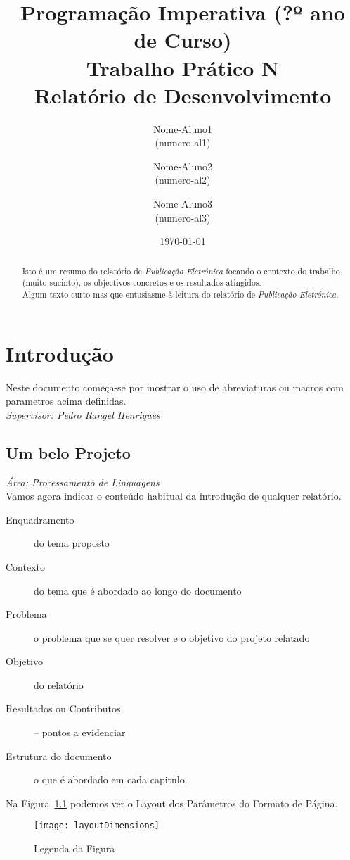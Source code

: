 \documentclass[12pt,a4paper]{report}%
\title{Programação Imperativa (?º ano de Curso)\\
       \textbf{Trabalho Prático N}\\ Relatório de Desenvolvimento
       } %
\author{Nome-Aluno1\\ (numero-al1) \and Nome-Aluno2\\ (numero-al2)
         \and Nome-Aluno3\\ (numero-al3)
       } %
\date{\today} %
\def\pe{\emph{Publicação Eletrónica}\xspace}
\def\titulo#1{\section{#1}}    %
\def\super#1{{\em Supervisor: #1}\\ }
\def\area#1{{\em \'{A}rea: #1}\\[0.2cm]}
\begin{document}
\maketitle %

\begin{abstract}  %
Isto é um resumo do relatório de \pe focando o contexto do trabalho (muito sucinto),
os objectivos concretos e os resultados atingidos.\\
Algum texto curto mas que entusiasme à leitura do relatório de \pe.
\end{abstract}

\tableofcontents %

\chapter{Introdução} \label{chap:intro} %

Neste documento começa-se por mostrar o uso de abreviaturas ou macros com parametros acima definidas.\\
\super{Pedro Rangel Henriques}
\titulo{Um belo Projeto}
\area{Processamento de Linguagens}

Vamos agora indicar o conteúdo habitual da introdução de qualquer relatório.
\begin{description}  %
  \item[Enquadramento]  do tema proposto
  \item[Contexto] do tema que é abordado ao  longo do documento
  \item[Problema] o problema que se quer resolver e o objetivo do projeto relatado
  \item[Objetivo] do relatório
  \item[Resultados ou Contributos] -- pontos a evidenciar
  \item[Estrutura do documento] o que é abordado em cada capitulo.
\end{description}

Na Figura~\ref{fig:layoutDimensions} podemos ver o Layout dos Parâmetros do Formato de Página.

 \begin{figure} %
       \centering %
       \texttt{[image: layoutDimensions]}
       \caption{Legenda da Figura} \label{fig:layoutDimensions} %
 \end{figure}
\end{document}
